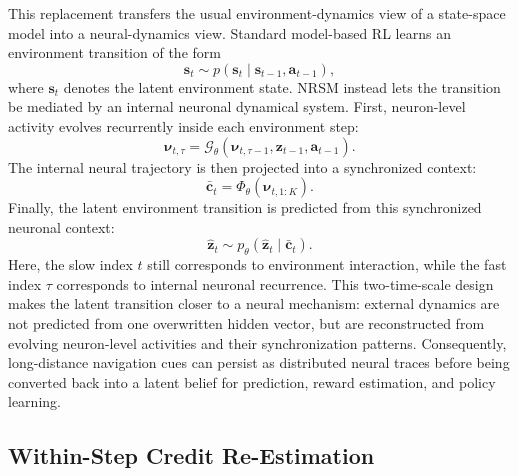 \documentclass{article}
\begin{document}
This replacement transfers the usual environment-dynamics view of a state-space model into a neural-dynamics view. Standard model-based RL learns an environment transition of the form
\begin{equation}
\mathbf s_t
\sim
p(\mathbf s_t\mid\mathbf s_{t-1},\mathbf a_{t-1}),
\label{eq:environment_dynamics}
\end{equation}
where $\mathbf s_t$ denotes the latent environment state. NRSM instead lets the transition be mediated by an internal neuronal dynamical system. First, neuron-level activity evolves recurrently inside each environment step:
\begin{equation}
\boldsymbol{\nu}_{t,\tau}
=
\mathcal G_{\theta}(
\boldsymbol{\nu}_{t,\tau-1},
\mathbf z_{t-1},
\mathbf a_{t-1}).
\label{eq:neural_activity_dynamics}
\end{equation}
The internal neural trajectory is then projected into a synchronized context:
\begin{equation}
\bar{\mathbf c}_t
=
\Phi_{\theta}
(\boldsymbol{\nu}_{t,1:K}).
\label{eq:neural_context_projection}
\end{equation}
Finally, the latent environment transition is predicted from this synchronized neuronal context:
\begin{equation}
\hat{\mathbf z}_t
\sim
p_{\theta}(\hat{\mathbf z}_t\mid\bar{\mathbf c}_t).
\label{eq:neural_dynamics_transfer}
\end{equation}
Here, the slow index $t$ still corresponds to environment interaction, while the fast index $\tau$ corresponds to internal neuronal recurrence. This two-time-scale design makes the latent transition closer to a neural mechanism: external dynamics are not predicted from one overwritten hidden vector, but are reconstructed from evolving neuron-level activities and their synchronization patterns. Consequently, long-distance navigation cues can persist as distributed neural traces before being converted back into a latent belief for prediction, reward estimation, and policy learning.

\subsection{Within-Step Credit Re-Estimation}
\end{document}
